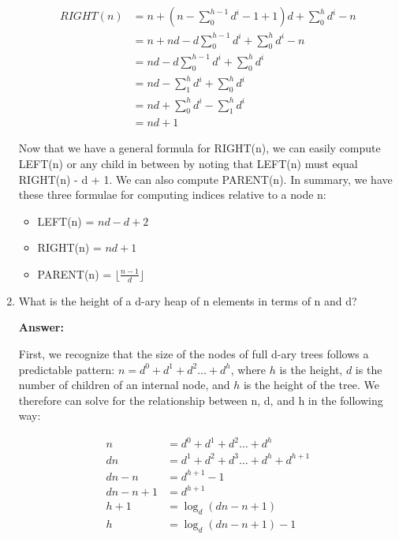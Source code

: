 \documentclass[]{book}
\theoremstyle{definition}
\begin{document}
\begin{enumerate}
    \begin{align*}
        RIGHT(n) &= n + (n - \sum_0^{h - 1} d^i - 1 + 1)d + \sum_0^h d^i - n \\
                 &= n + nd - d\sum_0^{h - 1} d^i + \sum_0^h d^i - n \\
                 &= nd - d\sum_0^{h - 1} d^i + \sum_0^h d^i  \\
                 &= nd - \sum_1^{h} d^i + \sum_0^h d^i  \\
                 &= nd + \sum_0^h d^i - \sum_1^{h} d^i\\
                 &= nd + 1
    \end{align*}

    Now that we have a general formula for RIGHT(n), we can easily compute LEFT(n)
    or any child in between by noting that LEFT(n) must equal RIGHT(n) - d + 1.
    We can also compute PARENT(n). In summary, we have these three 
    formulae for computing indices relative to a node n:
    \begin{itemize}
        \item LEFT(n) = $nd - d + 2$
        \item RIGHT(n) = $nd+1$
        \item PARENT(n) = $ \lfloor \frac{n - 1}{d} \rfloor$
    \end{itemize}

    \item What is the height of a d-ary heap of n elements in terms of n and d?

    \textbf{Answer:} 
    
    First, we recognize that the size of the nodes of full d-ary trees follows a
    predictable pattern: $n = d^0 + d^1 + d^2 \dots + d^h$, where $h$ is the height, $d$ is the number of children
    of an internal node, and $h$ is the height of the tree. We therefore can solve for the relationship between
    n, d, and h in the following way:

    \begin{align*}
        n &= d^0 + d^1 + d^2 \dots + d^h \\
        dn &= d^1 + d^2 + d^3 \dots + d^h + d^{h+1} \\
        dn - n &= d^{h+1} - 1 \\
        dn - n + 1 &= d^{h+1} \\
        h + 1 &= \log_d (dn - n + 1) \\
        h &= \log_d (dn - n + 1) - 1
    \end{align*}


\end{enumerate}
\end{document}
